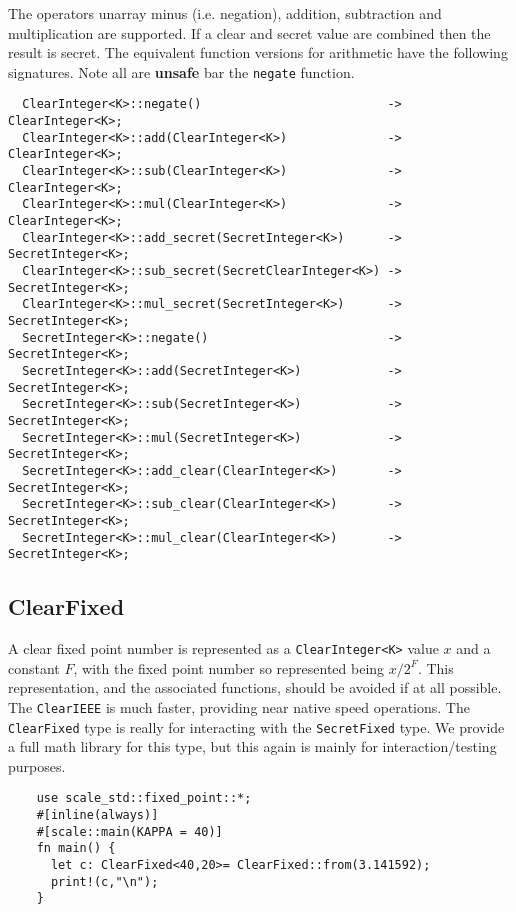 The operators unarray minus (i.e. negation), addition, subtraction
and multiplication are supported. If a clear and secret value are
combined then the result is secret.
The equivalent function versions for arithmetic have the following signatures.
Note all are {\bf unsafe} bar the \verb|negate| function.
\begin{lstlisting}
  ClearInteger<K>::negate()                          -> ClearInteger<K>;
  ClearInteger<K>::add(ClearInteger<K>)              -> ClearInteger<K>;
  ClearInteger<K>::sub(ClearInteger<K>)              -> ClearInteger<K>;
  ClearInteger<K>::mul(ClearInteger<K>)              -> ClearInteger<K>;
  ClearInteger<K>::add_secret(SecretInteger<K>)      -> SecretInteger<K>;
  ClearInteger<K>::sub_secret(SecretClearInteger<K>) -> SecretInteger<K>;
  ClearInteger<K>::mul_secret(SecretInteger<K>)      -> SecretInteger<K>;
  SecretInteger<K>::negate()                         -> SecretInteger<K>;
  SecretInteger<K>::add(SecretInteger<K>)            -> SecretInteger<K>;
  SecretInteger<K>::sub(SecretInteger<K>)            -> SecretInteger<K>;
  SecretInteger<K>::mul(SecretInteger<K>)            -> SecretInteger<K>;
  SecretInteger<K>::add_clear(ClearInteger<K>)       -> SecretInteger<K>;
  SecretInteger<K>::sub_clear(ClearInteger<K>)       -> SecretInteger<K>;
  SecretInteger<K>::mul_clear(ClearInteger<K>)       -> SecretInteger<K>;
\end{lstlisting}




\subsection{ClearFixed}
A clear fixed point number is represented as a \verb|ClearInteger<K>| value $x$ and
a constant $F$, with the fixed point number so represented being $x/2^F$.
This representation, and the associated functions, should be avoided
if at all possible. The \verb|ClearIEEE| is much faster, providing
near native speed operations. 
The \verb|ClearFixed| type is really for interacting with the
\verb|SecretFixed| type. We provide a full math library for this type, 
but this again is mainly for interaction/testing purposes.

\begin{lstlisting}
    use scale_std::fixed_point::*;
    #[inline(always)]
    #[scale::main(KAPPA = 40)]
    fn main() {
      let c: ClearFixed<40,20>= ClearFixed::from(3.141592);
      print!(c,"\n");
    }
\end{lstlisting}

